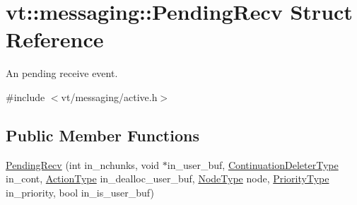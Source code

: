\hypertarget{structvt_1_1messaging_1_1_pending_recv}{}\section{vt\+:\+:messaging\+:\+:Pending\+Recv Struct Reference}
\label{structvt_1_1messaging_1_1_pending_recv}


An pending receive event.  




{\ttfamily \#include $<$vt/messaging/active.\+h$>$}

\subsection*{Public Member Functions}
\begin{DoxyCompactItemize}
\item 
\hyperlink{structvt_1_1messaging_1_1_pending_recv_ad697905a846ddb4fefb3a7b0348f3a5d}{Pending\+Recv} (int in\+\_\+nchunks, void $\ast$in\+\_\+user\+\_\+buf, \hyperlink{namespacevt_a6de3bd201e2a040be9362d9d24d1e446}{Continuation\+Deleter\+Type} in\+\_\+cont, \hyperlink{namespacevt_ae0a5a7b18cc99d7b732cb4d44f46b0f3}{Action\+Type} in\+\_\+dealloc\+\_\+user\+\_\+buf, \hyperlink{namespacevt_a866da9d0efc19c0a1ce79e9e492f47e2}{Node\+Type} node, \hyperlink{namespacevt_a86bff9f556eb761b27fc8600d006ac04}{Priority\+Type} in\+\_\+priority, bool in\+\_\+is\+\_\+user\+\_\+buf)
\end{DoxyCompactItemize}
